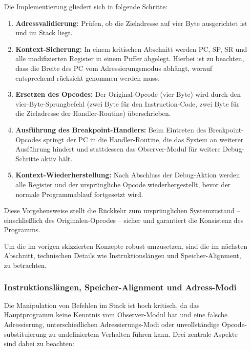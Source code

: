 Die Implementierung gliedert sich in folgende Schritte:
\begin{enumerate}
	\item \textbf{Adressvalidierung:} Pr\"ufen, ob die Zieladresse auf vier Byte ausgerichtet ist und im Stack liegt.
	  
	\item \textbf{Kontext-Sicherung:} In einem kritischen Abschnitt werden PC, SP, SR und alle modifizierten Register in einem Puffer abgelegt. Hierbei ist zu beachten, dass die Breite des PC vom Adressierungsmodus abh\"angt, worauf entsprechend r\"ucksicht genommen werden muss. 
	
	\item \textbf{Ersetzen des Opcodes:} Der Original-Opcode (vier Byte) wird durch den vier-Byte-Sprungbefehl (zwei Byte f\"ur den Instruction-Code, zwei Byte f\"ur die Zieladresse der Handler-Routine) \"uberschrieben. 
	
	\item \textbf{Ausf\"uhrung des Breakpoint-Handlers:} Beim Eintreten des Breakpoint-Opcodes springt der PC in die Handler-Routine, die das System an weiterer Ausf\"uhrung hindert und stattdessen das Observer-Modul f\"ur weitere Debug-Schritte aktiv h\"alt.
	
	\item \textbf{Kontext-Wiederherstellung:} Nach Abschluss der Debug-Aktion werden alle Register und der urspr\"ungliche Opcode wiederhergestellt, bevor der normale Programmablauf fortgesetzt wird.
\end{enumerate}

Diese Vorgehensweise stellt die R\"uckkehr zum urspr\"unglichen Systemzustand – einschlie{\ss}lich des Originalen-Opcodes – sicher und garantiert die Konsistenz des Programms.

Um die im vorigen  skizzierten Konzepte robust umzusetzen, sind die im n\"achsten Abschnitt, technischen Details wie Instruktionsl\"angen und Speicher-Alignment, zu betrachten.\AI



\newpage
\subsubsection{Instruktionsl\"angen, Speicher-Alignment und Adress-Modi}
\label{sec:TechnischeUmsetzunSoftwareBreakpoints}

Die Manipulation von Befehlen im Stack ist hoch kritisch, da das Hauptprogramm keine Kenntnis vom Observer-Modul hat und eine falsche Adressierung, unterschiedlichen Adressierungs-Modi oder unvollst\"andige Opcode-substituierung zu undefiniertem Verhalten f\"uhren kann. Drei zentrale Aspekte sind dabei zu beachten:


